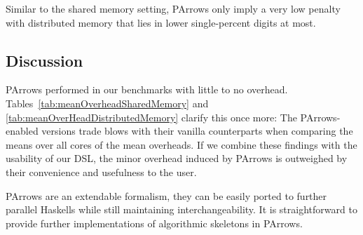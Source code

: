 Similar to the shared memory setting, PArrows only imply a very low penalty with distributed memory that lies in lower single-percent digits at most.

\subsection{Discussion}



PArrows performed in our benchmarks with little to no overhead. Tables~\ref{tab:meanOverheadSharedMemory} and \ref{tab:meanOverHeadDistributedMemory} clarify this once more: The PArrows-enabled versions trade blows with their vanilla counterparts when comparing the means over all cores of the mean overheads. If we combine these findings with the usability of our DSL,
the minor overhead induced by PArrows is outweighed by their convenience and usefulness to the user.

PArrows are an extendable formalism, they can be easily ported to further parallel Haskells while still maintaining interchangeability. It is straightforward to provide further implementations of algorithmic skeletons in PArrows.
